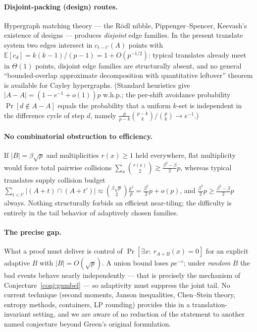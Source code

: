\documentclass[11pt]{article}
\theoremstyle{definition}
\newcommand{\E}{\mathbb{E}}
\newcommand{\Prob}{\Pr}
\begin{document}
\paragraph{Disjoint-packing (design) routes.}
Hypergraph matching theory --- the R\"odl nibble, Pippenger--Spencer, Keevash's
existence of designs --- produces \emph{disjoint} edge families. In the present
translate system two edges intersect in $c_{t-t'}(A)$ points with
$\E[c_d]=k(k-1)/(p-1)=1+O(p^{-1/2})$: typical translates already meet in
$\Theta(1)$ points, disjoint edge families are structurally absent, and no
general ``bounded-overlap approximate decomposition with quantitative
leftover'' theorem is available for Cayley hypergraphs. (Standard heuristics
give $|A-A|=(1-e^{-1}+o(1))p$ w.h.p.; the per-shift avoidance probability
$\Prob[d\notin A-A]$ equals the probability that a uniform $k$-set is
independent in the difference cycle of step $d$, namely
$\frac{p}{p-k}\binom{p-k}{k}/\binom pk\to e^{-1}$.)

\paragraph{No combinatorial obstruction to efficiency.}
If $|B|=\beta\sqrt p$ and multiplicities $r(x)\ge1$ held everywhere, flat
multiplicity would force total pairwise collisions
$\sum_x\binom{r(x)}{2}\gtrsim\frac{\beta^{2}-\beta}{2}p$, whereas typical
translates supply collision budget
$\sum_{t<t'}|(A+t)\cap(A+t')|
\approx\binom{\beta\sqrt p}{2}\frac{k^{2}}{p}
=\frac{\beta^{2}}{2}p+o(p)$, and
$\frac{\beta^{2}}2p\ge\frac{\beta^{2}-\beta}2p$ always. Nothing structurally
forbids an efficient near-tiling; the difficulty is entirely in the tail
behavior of adaptively chosen families.

\paragraph{The precise gap.}
What a proof must deliver is control of
$\Prob[\exists x:\ r_{A+B}(x)=0]$ for an explicit adaptive $B$ with
$|B|=O(\sqrt p)$. A union bound loses $pe^{-c}$; under \emph{random} $B$ the
bad events behave nearly independently --- that is precisely the mechanism of
Conjecture~\ref{conj:gumbel} --- so adaptivity must suppress the joint tail.
No current technique (second moments, Janson inequalities, Chen--Stein theory,
entropy methods, containers, LP rounding) provides this in a
translation-invariant setting, and we are aware of no reduction of
the statement to another named conjecture beyond Green's original formulation.
\end{document}
